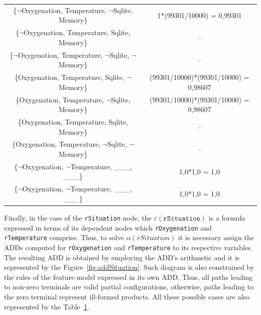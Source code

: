 \begin{table}[t]
{\begin{tabular}{cc}
  \{$\lnot$Oxygenation, Temperature, $\lnot$Sqlite, Memory\}  & 1*(99301/10000) = 0,99301   \\ 
  \{$\lnot$Oxygenation, Temperature, Sqlite, Memory\}         & --                                \\ 
  \{$\lnot$Oxygenation, Temperature, $\lnot$Sqlite, $\lnot$Memory\}         & --                                \\ 
  \{Oxygenation, Temperature, Sqlite, $\lnot$Memory\}  & (99301/10000)*(99301/10000) = 0,98607   \\ 
  \{Oxygenation, Temperature, $\lnot$Sqlite, Memory\}  & (99301/10000)*(99301/10000) = 0,98607   \\ 
  \{Oxygenation, Temperature, Sqlite, Memory\}         & --                                \\ 
  \{Oxygenation, Temperature, $\lnot$Sqlite, $\lnot$Memory\}         & --                                \\ 
  \{$\lnot$Oxygenation, $\lnot$Temperature, \_\_\_, \_\_\_\}  & 1,0*1,0 = 1,0   \\ 
  \{$\lnot$Oxygenation, $\lnot$Temperature, \_\_\_, \_\_\_\}  & 1,0*1,0 = 1,0   \\ 
  \bottomrule
  \end{tabular}
}
\label{table:oxygenation-reliability}
\end{table}

Finally, in the case of the \texttt{rSituation} node, the
$\varepsilon(\mathtt{rSituation})$ is a formula expressed in terms of its
dependent nodes which \texttt{rOxygenation} and \texttt{rTemperature} comprise.
Thus, to solve $\alpha(rSituation)$ it is necessary assign the ADDs computed
for \texttt{rOxygenation} and \texttt{rTemperature} to its respective
variables. The resulting ADD is obtained by employing the ADD's arithmetic and
it is represented by the Figure~\ref{fig:addSituation}. Such diagram is also
constrained by the rules of the feature model expressed in its own ADD. Thus,
all paths leading to non-zero terminals are valid partial configurations,
otherwise, paths leading to the zero terminal represent ill-formed products.
All these possible cases are also represented by the
Table~\ref{table:oxygenation-reliability}.

















